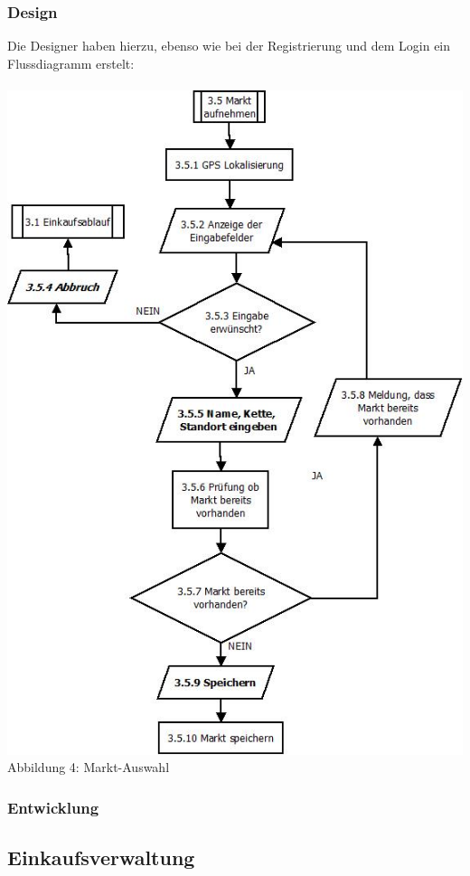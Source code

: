 \documentclass[12pt,a4paper]{article}
\begin{document}
\subsubsection*{Design}
Die Designer haben hierzu, ebenso wie bei der Registrierung und dem Login ein Flussdiagramm erstelt: 
\\
\\
\includegraphics[scale=0.6, origin=l]{Markt_Aufnahme.jpeg}
\\
\footnotesize Abbildung 4: Markt-Auswahl
\normalsize
\subsubsection*{Entwicklung}

\newpage
\subsection{Einkaufsverwaltung}
\end{document}

